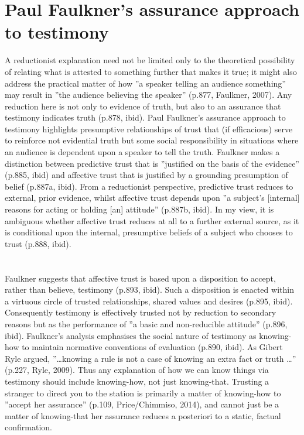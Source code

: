 \documentclass[a4paper, 11pt]{article} %
\begin{document}
\section*{Paul Faulkner's assurance approach to testimony}

A reductionist explanation need not be limited only to the theoretical possibility of relating what is attested to something further that makes it true; it might also address the practical matter of how ''a speaker telling an audience something'' may result in ''the audience believing the speaker'' (p.877, Faulkner, 2007)\cite{Faulkner:2007}. Any reduction here is not only to evidence of truth, but also to an assurance that testimony indicates truth (p.878, ibid)\cite{Faulkner:2007}. Paul Faulkner's assurance approach to testimony highlights presumptive relationships of trust that (if efficacious) serve to reinforce not evidential truth but some social responsibility in situations where an audience is dependent upon a speaker to tell the truth. Faulkner makes a distinction between predictive trust that is ''justified on the basis  of the evidence'' (p.885, ibid)\cite{Faulkner:2007} and affective trust that is justified by a grounding presumption of belief (p.887a, ibid)\cite{Faulkner:2007}. From a reductionist perspective, predictive trust reduces to external, prior evidence, whilst affective trust depends upon ''a subject's [internal] reasons for acting or holding [an] attitude'' (p.887b, ibid)\cite{Faulkner:2007}. In my view, it is ambiguous whether affective trust reduces at all to a further external source, as it is conditional upon the internal, presumptive beliefs of a subject who chooses to trust (p.888, ibid)\cite{Faulkner:2007}. 



\section*{}

Faulkner suggests that affective trust is based upon a disposition to accept, rather than believe, testimony (p.893, ibid). Such a disposition is enacted within a virtuous circle of trusted relationships, shared values and desires (p.895, ibid). Consequently testimony is effectively trusted not by reduction to secondary reasons but as the performance of ''a basic and non-reducible attitude'' (p.896, ibid). Faulkner's analysis emphasises the social nature of testimony as knowing-how to maintain normative conventions of evaluation (p.890, ibid). As Gibert Ryle argued, ''…knowing a rule is not a case of knowing an extra fact or truth …'' (p.227, Ryle, 2009). Thus any explanation of how we can know things via testimony should include knowing-how, not just knowing-that. Trusting a stranger to direct you to the station is primarily a matter of knowing-how to ''accept her assurance'' (p.109, Price/Chimmiso, 2014), and cannot just be a matter of knowing-that her assurance reduces a posteriori to a static, factual confirmation. 
\end{document}
